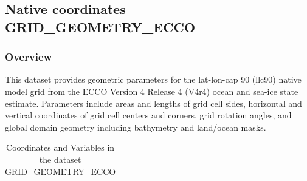 \subsection{Native coordinates GRID\_GEOMETRY\_ECCO}
\newp
\subsubsection{Overview}
This dataset provides geometric parameters for the lat-lon-cap 90 (llc90) native model grid from the ECCO Version 4 Release 4 (V4r4) ocean and sea-ice state estimate. Parameters include areas and lengths of grid cell sides, horizontal and vertical coordinates of grid cell centers and corners, grid rotation angles, and global domain geometry including bathymetry and land/ocean masks. 
\begin{longtable}{|m{}|m{}|m{}|}
\caption{Coordinates and Variables in the dataset GRID\_GEOMETRY\_ECCO}
\label{tab:table-<xarray.Dataset> Size: 89MB
Dimensions:  (tile: 13, j: 90, i: 90, j_g: 90, i_g: 90, k_p1: 51, k: 50,
              k_u: 50, k_l: 50, nb: 4, nv: 2)
Coordinates: (12/20)
  * tile     (tile) int32 52B 0 1 2 3 4 5 6 7 8 9 10 11 12
  * j        (j) int32 360B 0 1 2 3 4 5 6 7 8 9 ... 81 82 83 84 85 86 87 88 89
  * i        (i) int32 360B 0 1 2 3 4 5 6 7 8 9 ... 81 82 83 84 85 86 87 88 89
    XC       (tile, j, i) float32 421kB ...
    YC       (tile, j, i) float32 421kB ...
  * j_g      (j_g) int32 360B 0 1 2 3 4 5 6 7 8 9 ... 81 82 83 84 85 86 87 88 89
    ...       ...
    Zu       (k_u) float32 200B ...
  * k_l      (k_l) int32 200B 0 1 2 3 4 5 6 7 8 9 ... 41 42 43 44 45 46 47 48 49
    Zl       (k_l) float32 200B ...
    XC_bnds  (tile, j, i, nb) float32 2MB ...
    YC_bnds  (tile, j, i, nb) float32 2MB ...
    Z_bnds   (k, nv) float32 400B ...
Dimensions without coordinates: nb, nv
Data variables: (12/21)
    CS       (tile, j, i) float32 421kB ...
    SN       (tile, j, i) float32 421kB ...
    rA       (tile, j, i) float32 421kB ...
    dxG      (tile, j_g, i) float32 421kB ...
    dyG      (tile, j, i_g) float32 421kB ...
    Depth    (tile, j, i) float32 421kB ...
    ...       ...
    hFacC    (k, tile, j, i) float32 21MB ...
    hFacW    (k, tile, j, i_g) float32 21MB ...
    hFacS    (k, tile, j_g, i) float32 21MB ...
    maskC    (k, tile, j, i) bool 5MB ...
    maskW    (k, tile, j, i_g) bool 5MB ...
    maskS    (k, tile, j_g, i) bool 5MB ...
Attributes: (12/58)
    acknowledgement:                 This research was carried out by the Jet...
    author:                          Ian Fenty and Ou Wang
}
\end{longtable}
